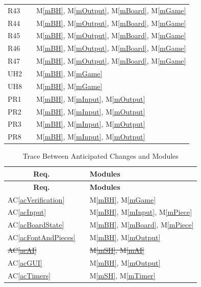 \documentclass[12pt, titlepage]{article}
\newcommand{\acref}[1]{AC\ref{#1}}
\newcommand{\mref}[1]{M\ref{#1}}
\begin{document}
\begin{center}
\begin{longtable}{l l l}
        R43 && \mref{mBH}, \mref{mOutput}, \mref{mBoard}, \mref{mGame}\\
        R44 && \mref{mBH}, \mref{mOutput}, \mref{mBoard}, \mref{mGame}\\
        R45 && \mref{mBH}, \mref{mOutput}, \mref{mBoard}, \mref{mGame}\\
        R46 && \mref{mBH}, \mref{mOutput}, \mref{mBoard}, \mref{mGame}\\
        R47 && \mref{mBH}, \mref{mOutput}, \mref{mBoard}, \mref{mGame}\\
        UH2 && \mref{mBH}, \mref{mGame}\\
        UH8 && \mref{mBH}, \mref{mGame}\\
        PR1 && \mref{mBH}, \mref{mInput}, \mref{mOutput}\\
        PR2 && \mref{mBH}, \mref{mInput}, \mref{mOutput}\\
        PR3 && \mref{mBH}, \mref{mInput}, \mref{mOutput}\\
        PR8 && \mref{mBH}, \mref{mInput}, \mref{mOutput}
    \end{longtable}
\end{center}

\begin{center}
    \begin{longtable}{l l l}
        \caption{Trace Between Anticipated Changes and Modules} \\
        
        \hline \multicolumn{1}{c}{\textbf{Req.}} & \multicolumn{1}{c}{} & \multicolumn{1}{l}{\textbf{Modules}} \\ \hline 
        \endfirsthead
        
        \multicolumn{1}{c}{\textbf{Req.}} & \multicolumn{1}{c}{} & \multicolumn{1}{l}{\textbf{Modules}} \\ \hline 
        \endhead
        
        \hline \hline
        \endlastfoot
        
        \acref{acVerification} && \mref{mBH}, \mref{mGame}\\
        \acref{acInput} && \mref{mBH}, \mref{mInput}, \mref{mPiece}\\
        \acref{acBoardState} && \mref{mBH}, \mref{mBoard}, \mref{mPiece}\\
        \acref{acFontAndPieces} && \mref{mBH}, \mref{mOutput}\\
        \sout{\acref{acAI}} && \sout{\mref{mSH}, \mref{mAI}}\\
        \acref{acGUI} && \mref{mBH}, \mref{mOutput}\\
        \acref{acTimers} && \mref{mSH}, \mref{mTimer}
    \end{longtable}
\end{center}
\end{document}
